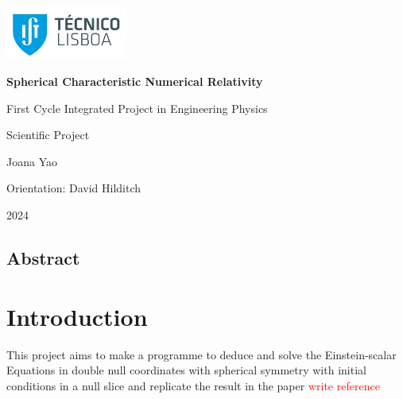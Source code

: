 \documentclass[11pt]{article}
\begin{document}
\begin{titlepage}


    \begin{flushleft}
        \vspace{-2.2cm}
        \includegraphics[width=4cm]{Images/college_logo.jpg}
    \end{flushleft}
    
    \vspace{7cm}
    
    \centering
    {\huge\textbf{Spherical Characteristic Numerical Relativity} \par}
    
    \vspace{5cm}
   
    {\large First Cycle Integrated Project in Engineering Physics\par}
    \vspace{0.5cm}
    {\large Scientific Project\par}
    \vspace{3cm}
    {\large Joana Yao\par}
    \vspace{0.5cm}
    {\large Orientation: David Hilditch\par}
    
    \vfill
    
    {\large 2024\par}
\end{titlepage}

\noindent
\hrulefill%
\begin{center}
    \section*{Abstract}

\end{center}
\hrulefill%
\vspace{0.5cm}

\section{Introduction}

This project aims to make a programme to deduce and solve the Einstein-scalar Equations in double null coordinates with spherical symmetry with initial conditions in a null slice and replicate the result in the paper \textcolor{red}{write reference}
\end{document}
